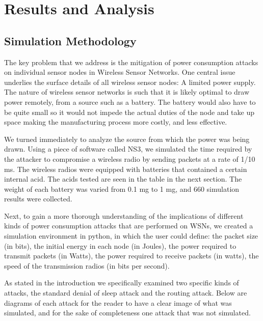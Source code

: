 \section{Results and Analysis}
\subsection{Simulation Methodology}
The key problem that we address is the mitigation of power consumption attacks on individual sensor nodes in Wireless Sensor Networks.  One central issue underlies the surface details of all wireless sensor nodes: A limited power supply. The nature of wireless sensor networks is such that it is likely optimal to draw power remotely, from a source such as a battery. The battery would also have to be quite small so it would not impede the actual duties of the node and take up space making the manufacturing process more costly, and less effective. 

We turned immediately to analyze the source from which the power was being drawn. Using a piece of software called NS3, we simulated the time required by the attacker to compromise a wireless radio by sending packets at a rate of 1/10 ms. The wireless radios were equipped with batteries that contained a certain internal acid. The acids tested are seen in the table in the next section. The weight of each battery was varied from 0.1 mg to 1 mg, and 660 simulation results were collected. 

Next, to gain a more thorough understanding of the implications of different kinds of power consumption attacks that are performed on WSNs, we created a simulation environment in python, in which the user could define: the packet size (in bits), the initial energy in each node (in Joules), the power required to transmit packets (in Watts), the power required to receive packets (in watts), the speed of the transmission radios (in bits per second). 

As stated in the introduction we specifically examined two specific kinds of attacks, the standard denial of sleep attack and the routing attack. Below are diagrams of each attack for the reader to have a clear image of what was simulated, and for the sake of completeness one attack that was not simulated.

